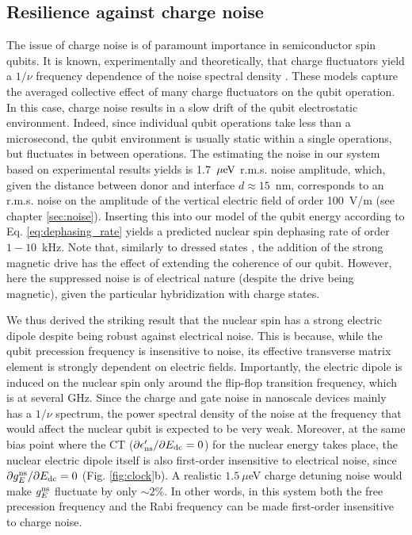 \subsection{Resilience against charge noise}

The issue of charge noise is of paramount importance in semiconductor spin qubits. It is known, experimentally and theoretically, that charge fluctuators yield a $1/\nu$ frequency dependence of the noise spectral density \cite{Paladino2014}. These models capture the averaged collective effect of many charge fluctuators on the qubit operation. In this case, charge noise results in a slow drift of the qubit electrostatic environment. Indeed, since individual qubit operations take less than a microsecond, the qubit environment is usually static within a single operations, but fluctuates in between operations. The estimating the noise in our system based on experimental results yields is 1.7~${\mu \rm eV}$ r.m.s. noise amplitude, which, given the distance between donor and interface $d \approx 15$~nm, corresponds to an r.m.s. noise on the amplitude of the vertical electric field of order 100~V/m (see chapter \ref{sec:noise}). Inserting this into our model of the qubit energy according to Eq. \eqref{eq:dephasing_rate} yields a predicted nuclear spin dephasing rate of order $1-10$~kHz. Note that, similarly to dressed states \cite{London2013,Laucht2016,Laucht2016a}, the addition of the strong magnetic drive has the effect of extending the coherence of our qubit. However, here the suppressed noise is of electrical nature (despite the drive being magnetic), given the particular hybridization with charge states.

We thus derived the striking result that the nuclear spin has a strong electric dipole despite being robust against electrical noise. This is because, while the qubit precession frequency is insensitive to noise, its effective transverse matrix element is strongly dependent on electric fields. Importantly, the electric dipole is induced on the nuclear spin  only around the flip-flop transition frequency, which is at several GHz. Since the charge and gate noise in nanoscale devices mainly has a $1/\nu$ spectrum, the power spectral density of the noise at the frequency that would affect the nuclear qubit is expected to be very weak. Moreover, at the same bias point where the CT ($\partial\epsilon'_{\rm ns}/\partial E_{\rm dc}=0$) for the nuclear energy takes place, the nuclear electric dipole itself is also first-order insensitive to electrical noise, since $\partial g_{E}^{\rm ns}/\partial E_{\rm dc}=0$ (Fig. \ref{fig:clock}b). A realistic $1.5~\mu$eV charge detuning noise \cite{Freeman2017} would make $g_{E}^{\rm ns}$ fluctuate by only $\sim2\%$. In other words, in this system both the free precession frequency and the Rabi frequency can be made first-order insensitive to charge noise.


